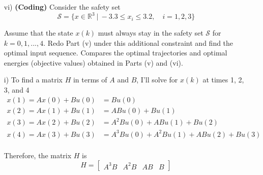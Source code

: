 \begin{homeworkProblem}
\begin{itemize}
        \item [vi)] \textbf{(Coding)} Consider the safety set 
            \begin{equation}
                \mathcal S=\{x \in \mathbb R^3 \ | \ -3.3 \leq x_i \leq 3.2,
                \quad i=1,2,3\}
            \end{equation}
            
            Assume that the state $x(k)$ must always stay in the safety set 
            $\mathcal S$ for $k=0,1,...,4$. Redo Part (v) under this additional 
            constraint and find the optimal input sequence. Compares the 
            optimal trajectories and optimal energies (objective values) 
            obtained in Parts (v) and (vi). 
    \end{itemize}

    \begin{solution}
    
        \begin{itemize}
            \item[i)] To find a matrix $H$ in terms of $A$ and $B$, I'll solve 
                for $x(k)$ at times 1, 2, 3, and 4
                \[
                    \begin{split}
                        x(1) = Ax(0) + Bu(0) &= Bu(0) \\
                        x(2) = Ax(1) + Bu(1) &= ABu(0) + Bu(1) \\
                        x(3) = Ax(2) + Bu(2) &= A^2Bu(0) + ABu(1) + Bu(2) \\
                        x(4) = Ax(3) + Bu(3) &= A^3Bu(0) + A^2Bu(1) + ABu(2) 
                        + Bu(3) \\
                    \end{split}
                \]
                
                Therefore, the matrix $H$ is
                \[
                    H = \left[ \begin{matrix} A^3B & A^2B & AB & B 
                    \end{matrix} \right]
                \]
                

\end{itemize}
\end{solution}
\end{homeworkProblem}
